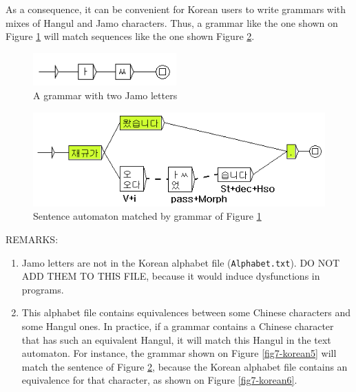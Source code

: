 \bigskip
\noindent As a consequence, it can be convenient for Korean users to write
grammars with mixes of Hangul and Jamo characters. Thus, a grammar like the one shown on
Figure \ref{fig7-korean3} will match sequences like the one shown Figure 
\ref{fig7-korean4}.

\begin{figure}[!ht]
\begin{center}
\includegraphics[width=5.5cm]{resources/img/fig7-korean3.png}
\caption{A grammar with two Jamo letters\label{fig7-korean3}}
\end{center}
\end{figure}

\begin{figure}[!ht]
\begin{center}
\includegraphics[width=13cm]{resources/img/fig7-korean4.png}
\caption{Sentence automaton matched by grammar of
Figure \ref{fig7-korean3}\label{fig7-korean4}}
\end{center}
\end{figure}

\bigskip
\noindent REMARKS: 
\begin{enumerate}
    \item Jamo letters are not in the Korean alphabet file
    (\verb+Alphabet.txt+). DO NOT ADD THEM TO THIS FILE, because it
    would induce dysfunctions in programs.
    
    \item This alphabet file contains equivalences between some Chinese
    characters and some Hangul ones. In practice, if a grammar contains a
    Chinese character that has such an equivalent Hangul, it will match this
    Hangul in the text automaton. For instance, the grammar shown on Figure
    \ref{fig7-korean5} will match the sentence of Figure \ref{fig7-korean4},
    because the Korean alphabet file contains an equivalence for that
    character, as shown on Figure \ref{fig7-korean6}.
\end{enumerate}

